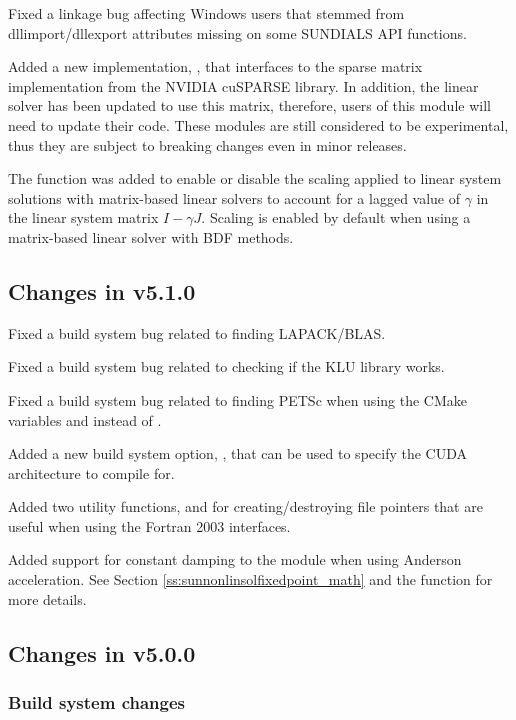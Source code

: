 Fixed a linkage bug affecting Windows users that stemmed from dllimport/dllexport
attributes missing on some SUNDIALS API functions.

Added a new  implementation, , that interfaces
to the sparse matrix implementation from the NVIDIA cuSPARSE library. In addition,
the  linear solver has been updated to
use this matrix, therefore, users of this module will need to update their code.
These modules are still considered to be experimental, thus they are subject to
breaking changes even in minor releases.

The function  was added to enable or disable
the scaling applied to linear system solutions with matrix-based linear solvers
to account for a lagged value of $\gamma$ in the linear system matrix
$I - \gamma J$. Scaling is enabled by default when using a matrix-based linear
solver with BDF methods.

\subsection*{Changes in v5.1.0}

Fixed a build system bug related to finding LAPACK/BLAS.

Fixed a build system bug related to checking if the KLU library works.

Fixed a build system bug related to finding PETSc when using the CMake
variables  and  instead of
.

Added a new build system option, , that can be used to specify
the CUDA architecture to compile for.

Added two utility functions,  and 
for creating/destroying file pointers that are useful when using the Fortran
2003 interfaces.

Added support for constant damping to the 
module when using Anderson acceleration. See Section
\ref{ss:sunnonlinsolfixedpoint_math} and the
 function for more details.

\subsection*{Changes in v5.0.0}

\subsubsection*{Build system changes}

